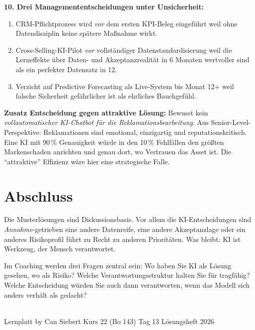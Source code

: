 \documentclass[11pt,a4paper,oneside]{article}
\begin{document}
\begin{loesungbox}
\textbf{10. Drei Managemententscheidungen unter Unsicherheit:}
\begin{enumerate}
  \item CRM-Pflichtprozess wird \emph{vor} dem ersten KPI-Beleg eingeführt \textendash{} weil ohne Datendisziplin keine spätere Maßnahme wirkt.
  \item Cross-Selling-KI-Pilot \emph{vor} vollständiger Datenstandardisierung \textendash{} weil die Lerneffekte über Daten- und Akzeptanzrealität in 6 Monaten wertvoller sind als ein perfekter Datensatz in 12.
  \item Verzicht auf Predictive Forecasting als Live-System bis Monat 12+ \textendash{} weil falsche Sicherheit gefährlicher ist als ehrliches Bauchgefühl.
\end{enumerate}

\smallskip
\textbf{Zusatz \textendash{} Entscheidung gegen attraktive Lösung:} Bewusst kein \emph{vollautomatischer KI-Chatbot für die Reklamationsbearbeitung}. Aus Senior-Level-Perspektive: Reklamationen sind emotional, einzigartig und reputationskritisch. Eine KI mit 90\,\% Genauigkeit würde in den 10\,\% Fehlfällen den größten Markenschaden anrichten \textendash{} und genau dort, wo Vertrauen das Asset ist. Die ``attraktive'' Effizienz wäre hier eine strategische Falle.
\end{loesungbox}

\clearpage

\section*{Abschluss}
\thispagestyle{plain}

\noindent Die Musterlösungen sind Diskussionsbasis. Vor allem die KI-Entscheidungen sind \emph{Annahme}-getrieben \textendash{} eine andere Datenreife, eine andere Akzeptanzlage oder ein anderes Risikoprofil führt zu Recht zu anderen Prioritäten. Was bleibt: KI ist Werkzeug, der Mensch verantwortet.

\medskip
\begin{infobox}
Im Coaching werden drei Fragen zentral sein: Wo haben Sie KI als Lösung gesehen, wo als Risiko? Welche Verantwortungsstruktur halten Sie für tragfähig? Welche Entscheidung würden Sie auch dann verantworten, wenn das Modell sich anders verhält als gedacht?
\end{infobox}

\vspace{1cm}
\noindent{\color{lpAccent}\rule{\linewidth}{0.6pt}}\\[4pt]
{\footnotesize\sffamily\color{lpGray}Lernplatt \textperiodcentered{} by Can Siebert \textperiodcentered{} Kurs 22 (Bo 143) \textperiodcentered{} Tag 13 \textperiodcentered{} Lösungsheft \textperiodcentered{} \textcopyright{} 2026}
\end{document}
